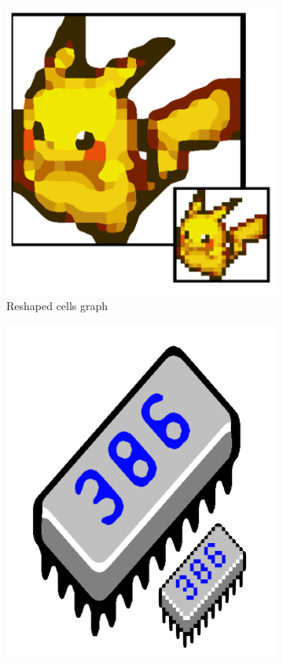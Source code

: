 \documentclass{article}
\begin{document}
\begin{figure}[h!]
\centering
    \begin{subfigure}[b]{0.4\textwidth}
        \includegraphics[width=1\textwidth]{f1}
        \caption{ Reshaped cells graph }
        \label{f1}
    \end{subfigure}
    \begin{subfigure}[b]{0.4\textwidth}
        \includegraphics[width=\textwidth]{f2}

\end{subfigure}
\end{figure}
\end{document}
